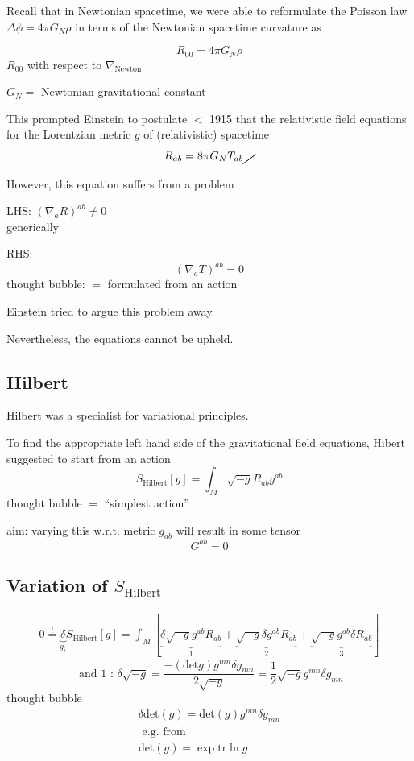 \documentclass[10pt]{amsart}
\begin{document}
\begin{multicols*}{2}
	Recall that in Newtonian spacetime, we were able to reformulate the Poisson law $\Delta \phi = 4\pi G_N \rho$ in terms of the Newtonian spacetime curvature as 
	
	\[
	R_{00} = 4\pi G_N \rho
	\]
	$R_{00}$ with respect to $\nabla_{\text{Newton}}$
	
	$G_N = $ Newtonian gravitational constant
	
	This prompted Einstein to postulate $<$ 1915 that the relativistic field equations for the Lorentzian metric $g$ of (relativistic) spacetime
	\[
	R_{ab} = 8\pi G_N T_{ab} \cancel{ \quad }
	\]
	
	However, this equation suffers from a problem
	
	LHS:
	$(\nabla_a R)^{ab} \neq 0$ \\
	generically
	
	RHS:
	\[
	(\nabla_a T)^{ab}  = 0
	\]
	thought bubble: $=$ formulated from an action
	
	Einstein tried to argue this problem away.  
	
	Nevertheless, the equations cannot be upheld. 
	
	\subsection{Hilbert}
	
	Hilbert was a specialist for variational principles. 
	
	To find the appropriate left hand side of the gravitational field equations, Hibert suggested to start from an action
	\[
	S_{\text{Hilbert}}[g] = \int_M \sqrt{-g} R_{ab}g^{ab}
	\]
	thought bubble $=$ ``simplest action''
	
	\underline{aim}: varying this w.r.t. metric $g_{ab}$ will result in some tensor 
	\[
	G^{ab} = 0
	\]
	
	\subsection{Variation of $S_{\text{Hilbert}}$}
	
	\[
	\begin{gathered}
	0 \overset{!}{=} \underbrace{\delta}_{g_i} S_{\text{Hilbert}}[g] = \int_M [ \underbrace{ \delta \sqrt{-g} g^{ab}R_{ab} }_{1} + \underbrace{ \sqrt{-g} \delta g^{ab} R_{ab}}_{2} + \underbrace{ \sqrt{-g} g^{ab} \delta R_{ab} }_{3} ] 
	\end{gathered}
	\]
	\[
	\text{ and 1 : } \delta \sqrt{-g} = \frac{ - (\text{det}g)g^{mn} \delta g_{mn} }{ 2 \sqrt{-g}} = \frac{1}{2} \sqrt{-g} g^{mn} \delta g_{mn}
	\]
	thought bubble
	\[
	\begin{gathered}
	\delta \text{det}(g) = \text{det}(g) g^{mn} \delta g_{mn} \\ 
	\text{ e.g. from } \\
	\text{det}(g) = \exp{ \text{tr}{ \ln{g} } }
	\end{gathered}
	\]
	

\end{multicols*}
\end{document}
